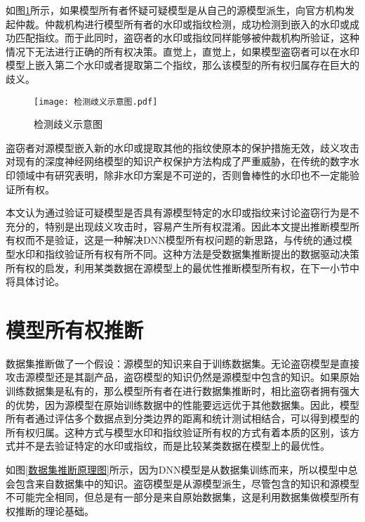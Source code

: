如图\ref{检测歧义示意图}所示，如果模型所有者怀疑可疑模型是从自己的源模型派生，向官方机构发起仲裁。仲裁机构进行模型所有者的水印或指纹检测，成功检测到嵌入的水印或成功匹配指纹。而于此同时，盗窃者的水印或指纹同样能够被仲裁机构所验证，这种情况下无法进行正确的所有权决策。直觉上，直觉上，如果模型盗窃者可以在水印模型上嵌入第二个水印或者提取第二个指纹，那么该模型的所有权归属存在巨大的歧义。

\begin{figure}[htb]%
	\centering
	\setlength{\abovecaptionskip}{3mm} %
	\setlength{\belowcaptionskip}{-3mm} %
	\texttt{[image: 检测歧义示意图.pdf]}
	\caption{检测歧义示意图}
	\label{检测歧义示意图}
\end {figure}

盗窃者对源模型嵌入新的水印或提取其他的指纹使原本的保护措施无效，歧义攻击对现有的深度神经网络模型的知识产权保护方法构成了严重威胁，在传统的数字水印领域中有研究表明，除非水印方案是不可逆的\cite{fan2019rethinking}，否则鲁棒性的水印也不一定能验证所有权。

本文认为通过验证可疑模型是否具有源模型特定的水印或指纹来讨论盗窃行为是不充分的，特别是出现歧义攻击时，容易产生所有权混淆。因此本文提出推断模型所有权而不是验证，这是一种解决DNN模型所有权问题的新思路，与传统的通过模型水印和指纹验证所有权有所不同。这种方法是受数据集推断\cite{maini2021dataset}提出的数据驱动决策所有权的启发，利用某类数据在源模型上的最优性推断模型所有权，在下一小节中将具体讨论。


\section{模型所有权推断}\label{3.2}

数据集推断做了一个假设：源模型的知识来自于训练数据集。无论盗窃模型是直接攻击源模型还是其副产品，盗窃模型的知识仍然是源模型中包含的知识。如果原始训练数据集是私有的，那么模型所有者在进行数据集推断时，相比盗窃者拥有强大的优势，因为源模型在原始训练数据中的性能要远远优于其他数据集。因此，模型所有者通过评估多个数据点到分类边界的距离和统计测试相结合，可以得到模型的所有权归属。这种方式与模型水印和指纹验证所有权的方式有着本质的区别，该方式并不是去验证特定的水印或指纹，而是比较某类数据在模型上的最优性。

如图\ref{数据集推断原理图}所示，因为DNN模型是从数据集训练而来，所以模型中总会包含来自数据集中的知识。盗窃模型是从源模型派生，尽管包含的知识和源模型不可能完全相同，但总是有一部分是来自原始数据集，这是利用数据集做模型所有权推断的理论基础。

